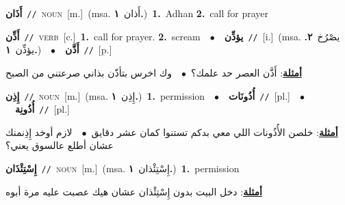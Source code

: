 \documentclass[10pt,a4paper,twoside]{article} %
\begin{document}
\begin{multicols}{2}
{{{{{{{{{{{{\setlength\topsep{0pt}\textbf{\foreignlanguage{arabic}{أَذَان}}\ {\color{gray}\texttt{//}\color{black}}\ \textsc{noun}\ [m.]\ \color{gray}(msa. \foreignlanguage{arabic}{أَذان}~\foreignlanguage{arabic}{\textbf{١.}})\color{black}\ \textbf{1.}~Adhan  \textbf{2.}~call for prayer\ 

{\setlength\topsep{0pt}\textbf{\foreignlanguage{arabic}{أَذِّن}}\ {\color{gray}\texttt{//}\color{black}}\ \textsc{verb}\ [c.]\ \textbf{1.}~call for prayer.  \textbf{2.}~scream\ \ $\bullet$\ \ \setlength\topsep{0pt}\textbf{\foreignlanguage{arabic}{يؤذِّن}}\ {\color{gray}\texttt{//}\color{black}}\ [i.]\ \color{gray}(msa. \foreignlanguage{arabic}{يصْرُخ}~\foreignlanguage{arabic}{\textbf{٢.}}  \foreignlanguage{arabic}{يؤذِّن}~\foreignlanguage{arabic}{\textbf{١.}})\color{black}\ \ $\bullet$\ \ \setlength\topsep{0pt}\textbf{\foreignlanguage{arabic}{أَذَّن}}\ {\color{gray}\texttt{//}\color{black}}\ [p.]\  \begin{flushright}\color{gray}\foreignlanguage{arabic}{\textbf{\underline{\foreignlanguage{arabic}{أمثلة}}}: أَذَّن العصر حد علمك؟\ $\bullet$\ \  وك اخرس بتأذّن بذاني صرعتني من الصبح}\end{flushright}\color{black}} \vspace{2mm}

{\setlength\topsep{0pt}\textbf{\foreignlanguage{arabic}{إِذِن}}\ {\color{gray}\texttt{//}\color{black}}\ \textsc{noun}\ [m.]\ \color{gray}(msa. \foreignlanguage{arabic}{إِذِن}~\foreignlanguage{arabic}{\textbf{١.}})\color{black}\ \textbf{1.}~permission\ \ $\bullet$\ \ \setlength\topsep{0pt}\textbf{\foreignlanguage{arabic}{أُذُونَات}}\ {\color{gray}\texttt{//}\color{black}}\ [pl.]\ \ $\bullet$\ \ \setlength\topsep{0pt}\textbf{\foreignlanguage{arabic}{أُذُونِة}}\ {\color{gray}\texttt{//}\color{black}}\ [pl.]\  \begin{flushright}\color{gray}\foreignlanguage{arabic}{\textbf{\underline{\foreignlanguage{arabic}{أمثلة}}}: خلصن الأُذُونات اللي معي بدكم تستنوا كمان عشر دقايق\ $\bullet$\ \  لازم أوخد إِذِنمنك عشان أطلع عالسوق يعني؟}\end{flushright}\color{black}} \vspace{2mm}

{\setlength\topsep{0pt}\textbf{\foreignlanguage{arabic}{إِسْتِئْذَان}}\ {\color{gray}\texttt{//}\color{black}}\ \textsc{noun}\ [m.]\ \color{gray}(msa. \foreignlanguage{arabic}{إِسْتِئْذان}~\foreignlanguage{arabic}{\textbf{١.}})\color{black}\ \textbf{1.}~permission\  \begin{flushright}\color{gray}\foreignlanguage{arabic}{\textbf{\underline{\foreignlanguage{arabic}{أمثلة}}}: دخل البيت بدون إِسْتِئْذان عشان هيك عصبت عليه مرة أبوه}\end{flushright}\color{black}} \vspace{2mm}

}}}}}}}}}}}}
\end{multicols}
\end{document}
